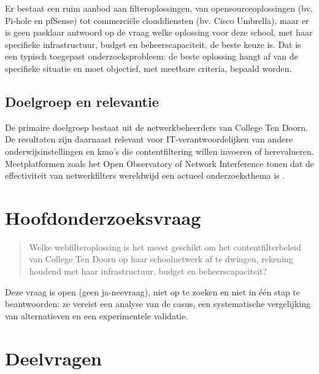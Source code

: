 \documentclass{hogent-article}
\begin{document}
Er bestaat een ruim aanbod aan filteroplossingen, van opensourceoplossingen (bv. Pi-hole en pfSense) tot commerciële clouddiensten (bv. Cisco Umbrella), maar er is geen pasklaar antwoord op de vraag welke oplossing voor deze school, met haar specifieke infrastructuur, budget en beheerscapaciteit, de beste keuze is. Dat is een typisch toegepast onderzoeksprobleem: de beste oplossing hangt af van de specifieke situatie en moet objectief, met meetbare criteria, bepaald worden.

\subsection{Doelgroep en relevantie}
De primaire doelgroep bestaat uit de netwerkbeheerders van College Ten Doorn. De resultaten zijn daarnaast relevant voor IT-verantwoordelijken van andere onderwijsinstellingen en kmo's die contentfiltering willen invoeren of herevalueren. Meetplatformen zoals het Open Observatory of Network Interference tonen dat de effectiviteit van netwerkfilters wereldwijd een actueel onderzoeksthema is \autocite{OONI2026}.

\section{Hoofdonderzoeksvraag}
\begin{quote}
    Welke webfilteroplossing is het meest geschikt om het contentfilterbeleid van College Ten Doorn op haar schoolnetwerk af te dwingen, rekening houdend met haar infrastructuur, budget en beheerscapaciteit?
\end{quote}
Deze vraag is open (geen ja-neevraag), niet op te zoeken en niet in één stap te beantwoorden: ze vereist een analyse van de casus, een systematische vergelijking van alternatieven en een experimentele validatie.

\section{Deelvragen}
\end{document}
